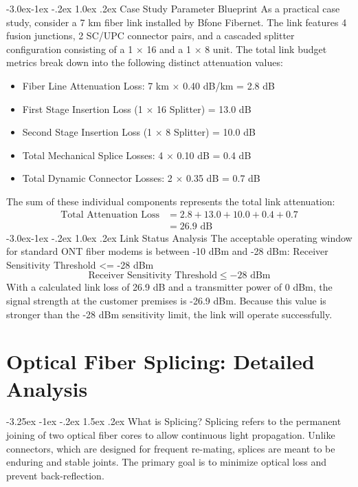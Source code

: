 \documentclass[11pt,a4paper]{report}
\makeatletter
\renewcommand{\section}{\@startsection{section}{1}{\z@}%
  {-3.25ex \@plus -1ex \@minus -.2ex}%
  {1.5ex \@plus.2ex}%
  {\normalfont\Large\bfseries\color{primaryColor}}}
\renewcommand{\subsection}{\@startsection{subsection}{2}{\z@}%
  {-3.0ex\@plus -1ex \@minus -.2ex}%
  {1.0ex \@plus .2ex}%
  {\normalfont\large\bfseries\color{secondaryColor}}}
\makeatother
\begin{document}
\subsection{Case Study Parameter Blueprint}
As a practical case study, consider a 7 km fiber link installed by Bfone Fibernet. The link features 4 fusion junctions, 2 SC/UPC connector pairs, and a cascaded splitter configuration consisting of a 1 $\times$ 16 and a 1 $\times$ 8 unit. The total link budget metrics break down into the following distinct attenuation values:
\begin{itemize}
  \item Fiber Line Attenuation Loss: 7 km $\times$ 0.40 dB/km = 2.8 dB
  \item First Stage Insertion Loss (1 $\times$ 16 Splitter) = 13.0 dB
  \item Second Stage Insertion Loss (1 $\times$ 8 Splitter) = 10.0 dB
  \item Total Mechanical Splice Losses: 4 $\times$ 0.10 dB = 0.4 dB
  \item Total Dynamic Connector Losses: 2 $\times$ 0.35 dB = 0.7 dB
\end{itemize}
The sum of these individual components represents the total link attenuation:
\begin{align*} \text{Total Attenuation Loss} &= 2.8 + 13.0 + 10.0 + 0.4 + 0.7 \\ &= 26.9\text{ dB} \end{align*}
\subsection{Link Status Analysis}
The acceptable operating window for standard ONT fiber modems is between -10 dBm and -28 dBm: Receiver Sensitivity Threshold <= -28 dBm
\begin{equation}\text{Receiver Sensitivity Threshold} \le -28\text{ dBm}\end{equation}
With a calculated link loss of 26.9 dB and a transmitter power of 0 dBm, the signal strength at the customer premises is -26.9 dBm. Because this value is stronger than the -28 dBm sensitivity limit, the link will operate successfully.
\chapter{Optical Fiber Splicing: Detailed Analysis}
\section{What is Splicing?}
Splicing refers to the permanent joining of two optical fiber cores to allow continuous light propagation. Unlike connectors, which are designed for frequent re-mating, splices are meant to be enduring and stable joints. The primary goal is to minimize optical loss and prevent back-reflection.
\end{document}
